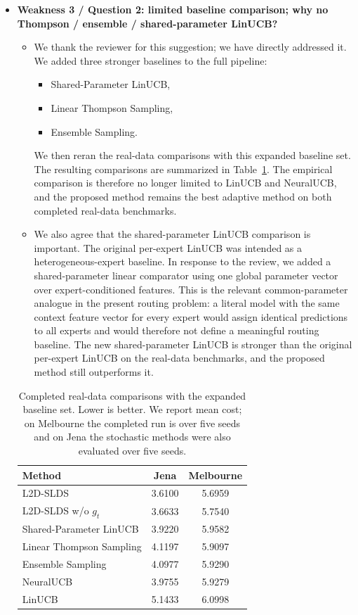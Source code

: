 \begin{itemize}
    \item \textbf{Weakness 3 / Question 2: limited baseline comparison; why no Thompson / ensemble / shared-parameter LinUCB?}
    \begin{itemize}
        \item We thank the reviewer for this suggestion; we have directly addressed it. We added three stronger baselines to the full pipeline:
        \begin{itemize}
            \item Shared-Parameter LinUCB,
            \item Linear Thompson Sampling,
            \item Ensemble Sampling.
        \end{itemize}
        We then reran the real-data comparisons with this expanded baseline set. The resulting comparisons are summarized in Table~\ref{tab:qba_perf}. The empirical comparison is therefore no longer limited to LinUCB and NeuralUCB, and the proposed method remains the best adaptive method on both completed real-data benchmarks.
        \item We also agree that the shared-parameter LinUCB comparison is important. The original per-expert LinUCB was intended as a heterogeneous-expert baseline. In response to the review, we added a shared-parameter linear comparator using one global parameter vector over expert-conditioned features. This is the relevant common-parameter analogue in the present routing problem: a literal model with the same context feature vector for every expert would assign identical predictions to all experts and would therefore not define a meaningful routing baseline. The new shared-parameter LinUCB is stronger than the original per-expert LinUCB on the real-data benchmarks, and the proposed method still outperforms it.
    \end{itemize}

    \begin{table}[h]
    \centering
    \caption{Completed real-data comparisons with the expanded baseline set. Lower is better. We report mean cost; on Melbourne the completed run is over five seeds and on Jena the stochastic methods were also evaluated over five seeds.}
    \label{tab:qba_perf}
    \begin{tabular}{lcc}
    \toprule
    \textbf{Method} & \textbf{Jena} & \textbf{Melbourne} \\
    \midrule
    L2D-SLDS & 3.6100 & 5.6959 \\
    L2D-SLDS w/o \(g_t\) & 3.6633 & 5.7540 \\
    Shared-Parameter LinUCB & 3.9220 & 5.9582 \\
    Linear Thompson Sampling & 4.1197 & 5.9097 \\
    Ensemble Sampling & 4.0977 & 5.9290 \\
    NeuralUCB & 3.9755 & 5.9279 \\
    LinUCB & 5.1433 & 6.0998 \\
    \bottomrule
    \end{tabular}
    \end{table}
\end{itemize}


